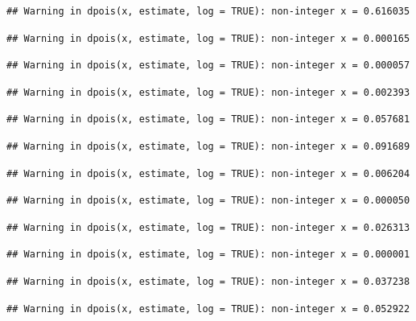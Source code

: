 \documentclass[]{article}
\begin{document}
\begin{verbatim}
## Warning in dpois(x, estimate, log = TRUE): non-integer x = 0.616035
\end{verbatim}

\begin{verbatim}
## Warning in dpois(x, estimate, log = TRUE): non-integer x = 0.000165
\end{verbatim}

\begin{verbatim}
## Warning in dpois(x, estimate, log = TRUE): non-integer x = 0.000057
\end{verbatim}

\begin{verbatim}
## Warning in dpois(x, estimate, log = TRUE): non-integer x = 0.002393
\end{verbatim}

\begin{verbatim}
## Warning in dpois(x, estimate, log = TRUE): non-integer x = 0.057681
\end{verbatim}

\begin{verbatim}
## Warning in dpois(x, estimate, log = TRUE): non-integer x = 0.091689
\end{verbatim}

\begin{verbatim}
## Warning in dpois(x, estimate, log = TRUE): non-integer x = 0.006204
\end{verbatim}

\begin{verbatim}
## Warning in dpois(x, estimate, log = TRUE): non-integer x = 0.000050
\end{verbatim}

\begin{verbatim}
## Warning in dpois(x, estimate, log = TRUE): non-integer x = 0.026313
\end{verbatim}

\begin{verbatim}
## Warning in dpois(x, estimate, log = TRUE): non-integer x = 0.000001
\end{verbatim}

\begin{verbatim}
## Warning in dpois(x, estimate, log = TRUE): non-integer x = 0.037238
\end{verbatim}

\begin{verbatim}
## Warning in dpois(x, estimate, log = TRUE): non-integer x = 0.052922
\end{verbatim}
\end{document}
